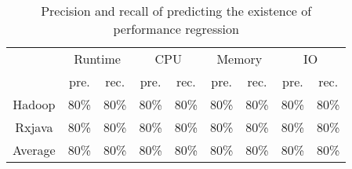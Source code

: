\begin{table}[]
	\centering
	\footnotesize
	\caption{Precision and recall of predicting the existence of performance regression}
	\label{tab:logistic}
\begin{tabular}{|c|c|r|c|r|c|r|c|r|}
	\hline
	\multirow{2}{*}{}             & \multicolumn{2}{c|}{Runtime}                          & \multicolumn{2}{c|}{CPU}                              & \multicolumn{2}{c|}{Memory}                           & \multicolumn{2}{c|}{IO}                               \\ \cline{2-9} 
	& pre.                      & \multicolumn{1}{c|}{rec.} & pre.                      & \multicolumn{1}{c|}{rec.} & pre.                      & \multicolumn{1}{c|}{rec.} & pre.                      & \multicolumn{1}{c|}{rec.} \\ \hline
	Hadoop                        & \multicolumn{1}{r|}{80\%} & 80\%                      & \multicolumn{1}{r|}{80\%} & 80\%                      & \multicolumn{1}{r|}{80\%} & 80\%                      & \multicolumn{1}{r|}{80\%} & 80\%                      \\ \hline
	Rxjava                        & \multicolumn{1}{r|}{80\%} & 80\%                      & \multicolumn{1}{r|}{80\%} & 80\%                      & \multicolumn{1}{r|}{80\%} & 80\%                      & \multicolumn{1}{r|}{80\%} & 80\%                      \\ \hline
	\multicolumn{1}{|l|}{Average} & \multicolumn{1}{l|}{80\%} & \multicolumn{1}{l|}{80\%} & \multicolumn{1}{l|}{80\%} & \multicolumn{1}{l|}{80\%} & \multicolumn{1}{l|}{80\%} & \multicolumn{1}{l|}{80\%} & \multicolumn{1}{l|}{80\%} & \multicolumn{1}{l|}{80\%} \\ \hline
\end{tabular}
\end{table}

